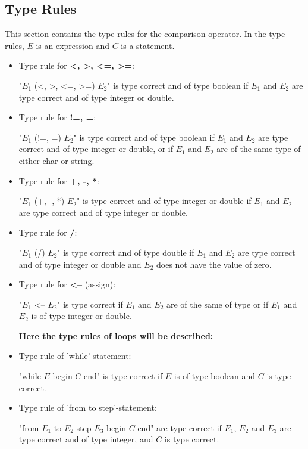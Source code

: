 \subsection{Type Rules} %
This section contains the type rules for the comparison operator. In the type rules, $E$ is an expression and $C$ is a statement.
\begin{itemize}
\item Type rule for \textbf{<, >, <=, >=}:

"$E_1$ (<, >, <=, >=) $E_2$" is type correct and of type boolean if $E_1$ and $E_2$ are type correct and of type integer or double.

\item Type rule for \textbf{!=, =}:

"$E_1$ (!=, =) $E_2$" is type correct and of type boolean if $E_1$ and $E_2$ are type correct and of type integer or double, or if $E_1$ and $E_2$ are of the same type of either char or string.

\item Type rule for \textbf{+, -, *}:

"$E_1$ (+, -, *) $E_2$" is type correct and of type integer or double if $E_1$ and $E_2$ are type correct and of type integer or double.

\item Type rule for \textbf{/}:

"$E_1$ (/) $E_2$" is type correct and of type double if $E_1$ and $E_2$ are type correct and of type integer or double and $E_2$ does not have the value of zero.

\item Type rule for \textbf{<--} (assign):

"$E_1$ <-- $E_2$" is type correct if $E_1$ and $E_2$ are of the same of type or if $E_1$ and $E_2$ is of type integer or double.

\textbf{Here the type rules of loops will be described:}

\item Type rule of 'while'-statement: 

"while $E$ begin $C$ end" is type correct if $E$ is of type boolean and $C$ is type correct.

\item Type rule of 'from to step'-statement: 

"from $E_1$ to $E_2$ step $E_3$ begin $C$ end" are type correct if $E_1$, $E_2$ and $E_3$ are type correct and of type integer, and $C$ is type correct.


\end{itemize}
